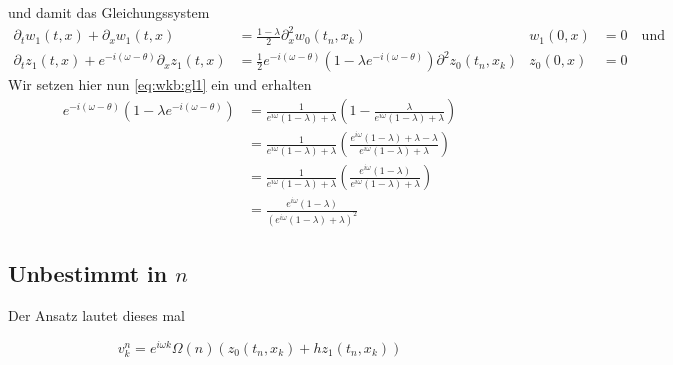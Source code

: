 und damit das Gleichungssystem
{\small
\begin{align}
\partial_t w_1(t,x) + \partial_x w_1(t,x) &= \frac {1-\lambda}{2} \partial^2_x w_0(t_n, x_k) &w_1(0,x) &= 0 \quad \text{und}\\
\partial_t z_1(t,x) + e^{-i (\omega - \theta)} \partial_x z_1(t,x) &= \frac{1}{2} e^{- i(\omega - \theta)} \left(1 - \lambda e^{-i(\omega - \theta)} \right) \partial^2 z_0(t_n, x_k) &z_0(0,x) &= 0 
\end{align}}
Wir setzen hier nun \eqref{eq:wkb:gl1} ein und erhalten
\begin{align*}
e^{- i(\omega - \theta)} \left(1 - \lambda e^{-i(\omega - \theta)} \right) &= \frac{1}{ e^{i \omega} (1 -  \lambda) + \lambda } \left( 1 - \frac{\lambda}{ e^{i \omega} (1 -  \lambda) + \lambda } \right)\\
&= \frac{1}{ e^{i \omega} (1 -  \lambda) + \lambda } \left( \frac{e^{i \omega} (1 -  \lambda) + \lambda - \lambda}{ e^{i \omega} (1 -  \lambda) + \lambda } \right)\\
&= \frac{1}{ e^{i \omega} (1 -  \lambda) + \lambda } \left( \frac{e^{i \omega} (1 -  \lambda) }{ e^{i \omega} (1 -  \lambda) + \lambda } \right)\\
&= \frac{e^{i \omega} (1 -  \lambda) }{ \left(e^{i \omega} (1 -  \lambda) + \lambda \right)^2 }
\end{align*}

\subsection*{Unbestimmt in $n$}

Der Ansatz lautet dieses mal 

\[ v^n_k = e^{i \omega k} \Omega(n) \left( z_0(t_n, x_k) + h z_1(t_n, x_k) \right) \]


